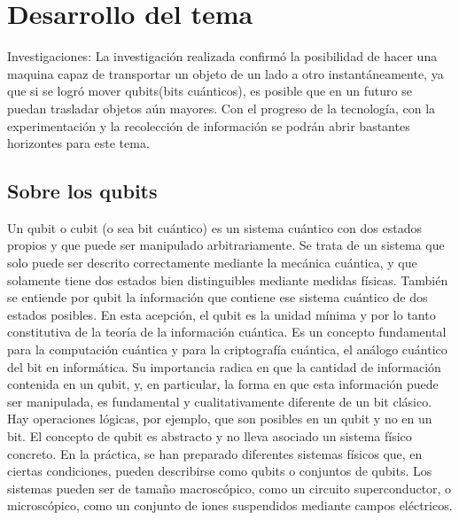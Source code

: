 \documentclass{bmcart}
\begin{document}
\section*{Desarrollo del tema}
Investigaciones:
La investigación realizada confirmó la posibilidad de hacer una maquina capaz de transportar un objeto de un lado a otro instantáneamente, ya que si se logró mover qubits(bits cuánticos), es posible que en un futuro se puedan trasladar objetos aún mayores. Con el progreso de la tecnología, con la experimentación y la recolección de información se podrán abrir bastantes horizontes para este tema.
\subsection*{Sobre los qubits}
Un qubit o cubit (o sea bit cuántico) es un sistema cuántico con dos estados propios y que puede ser manipulado arbitrariamente. Se trata de un sistema que solo puede ser descrito correctamente mediante la mecánica cuántica, y que solamente tiene dos estados bien distinguibles mediante medidas físicas. También se entiende por qubit la información que contiene ese sistema cuántico de dos estados posibles. En esta acepción, el qubit es la unidad mínima y por lo tanto constitutiva de la teoría de la información cuántica. Es un concepto fundamental para la computación cuántica y para la criptografía cuántica, el análogo cuántico del bit en informática.
Su importancia radica en que la cantidad de información contenida en un qubit, y, en particular, la forma en que esta información puede ser manipulada, es fundamental y cualitativamente diferente de un bit clásico. Hay operaciones lógicas, por ejemplo, que son posibles en un qubit y no en un bit.
El concepto de qubit es abstracto y no lleva asociado un sistema físico concreto. En la práctica, se han preparado diferentes sistemas físicos que, en ciertas condiciones, pueden describirse como qubits o conjuntos de qubits. Los sistemas pueden ser de tamaño macroscópico, como un circuito superconductor, o microscópico, como un conjunto de iones suspendidos mediante campos eléctricos.
\end{document}
